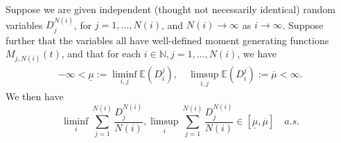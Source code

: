 \begin {lem}\label{llnbound}

Suppose we are given independent (thought not necessarily identical) random variables $D_j^{N(i)}$, for $j = 1, \dots, N(i)$, and $N(i) \rightarrow \infty$ as $i \rightarrow \infty$. Suppose further that the variables all have well-defined moment generating functions $M_{j,N(i)}(t)$, and that for each $i \in \mathbb N, j = 1, \dots, N(i)$, we have
\begin{eqnarray}
-\infty<\underline{\mu} := \liminf_{i,j} \mathbb{E}(D_i^j),\quad 
\limsup_{i,j} \mathbb{E}(D_i^j):=\overline{\mu}<\infty. 
\end{eqnarray}  
We then have
\begin{equation}
\liminf_{i} \sum_{j = 1}^{N(i)} \frac{D_j^{N(i)}}{N(i)},\limsup_{i} \sum_{j = 1}^{N(i)} \frac{D_j^{N(i)}}{N(i)} \in [\underline{\mu}, \overline{\mu}] \quad {a.s.}
\end{equation}
\end {lem}
